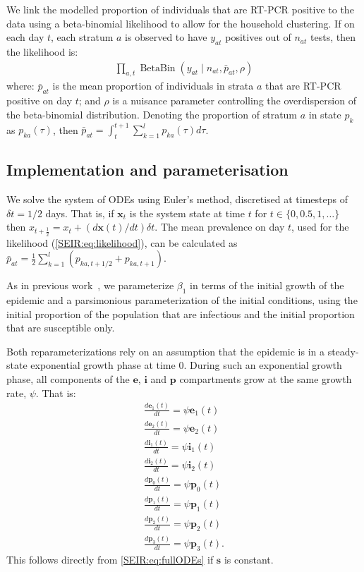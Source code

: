 \documentclass[9pt,twocolumn,twoside]{pnas-new}
\DeclareMathOperator{\BB}{BetaBin}
\renewcommand{\vec}[1]{\bm{#1}}
\begin{document}
We link the modelled proportion of individuals that are RT-PCR positive to the data using a beta-binomial likelihood to allow for the household clustering.
If on each day $t$, each stratum $a$ is observed to have $y_{at}$ positives out of $n_{at}$ tests, then the likelihood is:
\begin{align}
    \prod_{a,t} \BB (y_{at} \mid n_{at}, \bar{p}_{at}, \rho)
    \label{SEIR:eq:likelihood}
\end{align}
where: $\bar{p}_{at}$ is the mean proportion of individuals in strata $a$ that are RT-PCR positive on day $t$; and $\rho$ is a nuisance parameter controlling the overdispersion of the beta-binomial distribution.
Denoting the proportion of stratum $a$ in state $p_k$ as $p_{ka}(\tau)$, then $\bar{p}_{at} = \int_{t}^{t+1} \sum_{k=1}^l p_{ka}(\tau) d\tau$.

\subsection*{Implementation and parameterisation}

We solve the system of ODEs using Euler's method, discretised at timesteps of $\delta t = 1/2$ days.
That is, if $\vec{x}_t$ is the system state at time $t$ for $t \in \{ 0, 0.5, 1, \dots \}$ then $x_{t+\frac{1}{2}} = x_t + (d\vec{x}(t)/dt) \delta t$.
The mean prevalence on day $t$, used for the likelihood (\cref{SEIR:eq:likelihood}), can be calculated as $\bar{p}_{at} = \frac{1}{2} \sum_{k=1}^l ( p_{ka,t+1/2} + p_{ka,t+1} )$.

As in previous work~\citep{birrellBayesian}, we parameterize $\beta_1$ in terms of the initial growth of the epidemic and a parsimonious parameterization of the initial conditions, using the initial proportion of the population that are infectious and the initial proportion that are susceptible only.

Both reparameterizations rely on an assumption that the epidemic is in a steady-state exponential growth phase at time 0. During such an exponential growth phase, all components of the $\vec{e}$, $\vec{i}$ and $\vec{p}$ compartments grow at the same growth rate, $\psi$.
That is:
\begin{equation}
\begin{aligned}
\frac{d\vec{e}_1(t)}{dt} = \psi \vec{e}_1(t) \\
\frac{d\vec{e}_2(t)}{dt} = \psi \vec{e}_2(t) \\
\frac{d\vec{i}_1(t)}{dt} = \psi \vec{i}_1(t) \\
\frac{d\vec{i}_2(t)}{dt} = \psi \vec{i}_2(t) \\
\frac{d\vec{p}_0(t)}{dt} = \psi \vec{p}_0(t) \\
\frac{d\vec{p}_1(t)}{dt} = \psi \vec{p}_1(t) \\
\frac{d\vec{p}_2(t)}{dt} = \psi \vec{p}_2(t) \\
\frac{d\vec{p}_3(t)}{dt} = \psi \vec{p}_3(t).
\end{aligned}
\label{SEIR:eq:exponential-growth}
\end{equation}
This follows directly from \cref{SEIR:eq:fullODEs} if $\vec{s}$ is constant. 
\end{document}
